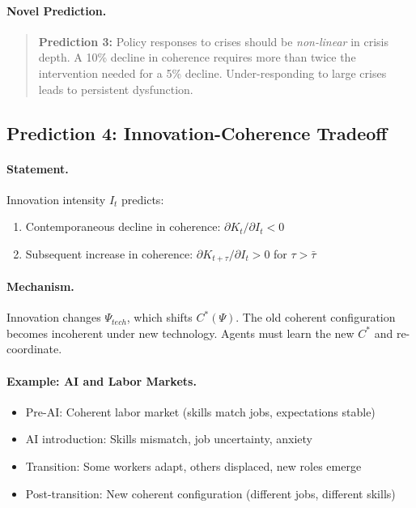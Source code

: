\documentclass[12pt,a4paper]{article}
\begin{document}
\paragraph{Novel Prediction.}
\begin{quote}
\textbf{Prediction 3:} Policy responses to crises should be
\emph{non-linear} in crisis depth. A 10\% decline in coherence
requires more than twice the intervention needed for a 5\% decline.
Under-responding to large crises leads to persistent dysfunction.
\end{quote}

\subsection{Prediction 4: Innovation-Coherence Tradeoff}

\paragraph{Statement.}
Innovation intensity $I_t$ predicts:
\begin{enumerate}
  \item[(a)] Contemporaneous decline in coherence: $\partial K_t / \partial I_t < 0$
  \item[(b)] Subsequent increase in coherence: $\partial K_{t+\tau} / \partial I_t > 0$ for $\tau > \bar{\tau}$
\end{enumerate}

\paragraph{Mechanism.}
Innovation changes $\Psi_{tech}$, which shifts $C^*(\Psi)$.
The old coherent configuration becomes incoherent under new technology.
Agents must learn the new $C^*$ and re-coordinate.

\paragraph{Example: AI and Labor Markets.}
\begin{itemize}
  \item Pre-AI: Coherent labor market (skills match jobs, expectations stable)
  \item AI introduction: Skills mismatch, job uncertainty, anxiety
  \item Transition: Some workers adapt, others displaced, new roles emerge
  \item Post-transition: New coherent configuration (different jobs, different skills)
\end{itemize}
\end{document}
